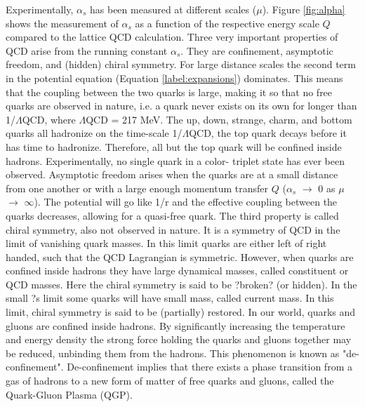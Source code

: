 Experimentally, $\alpha_{s}$ has been measured at different scales ($\mu$). Figure \ref{fig:alpha} shows the measurement of $\alpha_{s}$ as a function of the respective energy scale $Q$ compared to the lattice QCD calculation.
Three very important properties of QCD arise from the running constant $\alpha_{s}$. They are confinement, asymptotic freedom, and (hidden) chiral symmetry. For large distance scales the second term in the potential equation (Equation \ref{label:expansions}) dominates. This means that the coupling between the two quarks is large, making it so that no free quarks are observed in nature, i.e. a quark never exists on its own for longer than 1/$\Lambda$QCD, where $\Lambda$QCD = 217 MeV. The up, down, strange, charm, and bottom quarks all hadronize on the time-scale 1/$\Lambda$QCD, the top quark decays before it has time to hadronize. Therefore, all but the top quark will be confined inside hadrons. Experimentally, no single quark in a color- triplet state has ever been observed.
Asymptotic freedom arises when the quarks are at a small distance from one another or with a large enough momentum transfer $Q$ ($\alpha_{s}$ $\rightarrow$ 0 as $\mu$ $\rightarrow$ $\infty$). The potential will go like 1/r and the effective coupling between the quarks decreases, allowing for a quasi-free quark. The third property is called chiral symmetry, also not observed in nature. It is a symmetry of QCD in the limit of vanishing quark masses. In this limit quarks are either left of right handed, such that the QCD Lagrangian is symmetric. However, when quarks are confined inside hadrons they have large dynamical masses, called constituent or QCD masses. Here the chiral symmetry is said to be ?broken? (or hidden). In the small ?s limit some quarks will have small mass, called current mass. In this limit, chiral symmetry is said to be (partially) restored.
In our world, quarks and gluons are confined inside hadrons. By significantly increasing the temperature and energy density the strong force holding the quarks and gluons together may be reduced, unbinding them from the hadrons. This phenomenon is known as "de-confinement". De-confinement implies that there exists a phase transition from a gas of hadrons to a new form of matter of free quarks and gluons, called the Quark-Gluon Plasma (QGP).

\newpage
